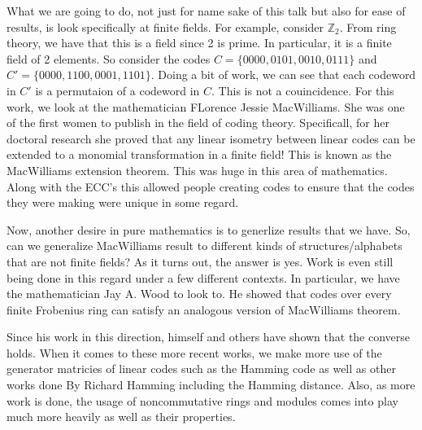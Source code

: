 What we are going to do, not just for name sake of this talk but also for ease of results, is look
specifically at finite fields. For example, consider $\mathbb{Z}_2$. From ring theory, we
have that this is a field since 2 is prime. In particular, it is a finite field of 2 elements. So
consider the codes $C=\{0000,0101,0010,0111\}$ and $C'=\{0000,1100,0001,1101\}$. Doing a bit of work, we
can see that each codeword in $C'$ is a permutaion of a codeword in $C$. This is not a couincidence.
For this work, we look at the mathematician FLorence Jessie MacWilliams. She was one of the first women
to publish in the field of coding theory. Specificall, for her doctoral research she proved that any
linear isometry between linear codes can be extended to a monomial transformation in a finite field!
This is known as the MacWilliams extension theorem. This was huge in this area of mathematics. Along
with the ECC's this allowed people creating codes to ensure that the codes they were making were unique
in some regard.

Now, another desire in pure mathematics is to generlize results that we have. So, can we generalize
MacWilliams result to different kinds of structures/alphabets that are not finite fields? As it turns
out, the answer is yes. Work is even still being done in this regard under a few different contexts.
In particular, we have the mathematician Jay A. Wood to look to. He showed that codes over every finite
Frobenius ring can satisfy an analogous version of MacWilliams theorem.

Since his work in this direction, himself and others have shown that the converse holds. When it comes
to these more recent works, we make more use of the generator matricies of linear codes such as the
Hamming code as well as other works done By Richard Hamming including the Hamming distance. Also, as
more work is done, the usage of noncommutative rings and modules comes into play much more heavily
as well as their properties.

